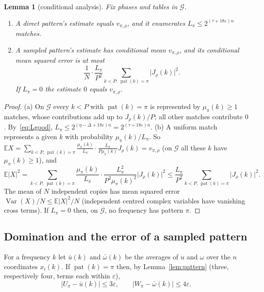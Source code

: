 \documentclass[11pt]{article}
\newtheorem{lemma}{Lemma}[section]
\theoremstyle{definition}
\newcommand{\E}{\mathbb E}
\newcommand{\eps}{\varepsilon}
\newcommand{\abs}[1]{\lvert #1\rvert}
\newcommand{\Var}{\operatorname{Var}}
\newcommand{\cG}{\mathcal G}
\newcommand{\pat}{\operatorname{pat}}
\begin{document}
\begin{lemma}[conditional analysis]\label{lem:cond}
Fix phases and tables in $\cG$.
\begin{enumerate}[label=\textup{(\alph*)}]
\item A direct pattern's estimate equals $v_{\pi,\rho}$, and it enumerates $L_\pi\le2^{(\tau+18\eps)n}$ matches.
\item A sampled pattern's estimate has conditional mean $v_{\pi,\rho}$, and its conditional mean squared error is at
most
\begin{equation}\label{eq:mse}
 \frac1N\cdot\frac{L_\pi}{P^2}\sum_{k<P:\ \pat(k)=\pi}\abs{J_\rho(k)}^2 .
\end{equation}
If $L_\pi=0$ the estimate $0$ equals $v_{\pi,\rho}$.
\end{enumerate}
\end{lemma}
\begin{proof}
(a) On $\cG$ every $k<P$ with $\pat(k)=\pi$ is represented by $\mu_\pi(k)\ge1$ matches, whose contributions add up to
$J_\rho(k)/P$; all other matches contribute $0$. By~\eqref{eq:Lgood},
$L_\pi\le2^{(\eta-\Delta+18\eps)n}=2^{(\tau+18\eps)n}$. (b) A uniform match represents a given $k$ with probability
$\mu_\pi(k)/L_\pi$. So $\E X=\sum_{k<P,\,\pat(k)=\pi}\frac{\mu_\pi(k)}{L_\pi}\cdot\frac{L_\pi}{P\mu_\pi(k)}J_\rho(k)=v_{\pi,\rho}$
(on $\cG$ all these $k$ have $\mu_\pi(k)\ge1$), and
\[
 \E\abs X^2=\sum_{k<P,\,\pat(k)=\pi}\frac{\mu_\pi(k)}{L_\pi}\cdot\frac{L_\pi^2}{P^2\mu_\pi(k)^2}\abs{J_\rho(k)}^2
 \le\frac{L_\pi}{P^2}\sum_{k<P,\,\pat(k)=\pi}\abs{J_\rho(k)}^2 .
\]
The mean of $N$ independent copies has mean squared error $\Var(X)/N\le\E\abs X^2/N$ (independent centred complex
variables have vanishing cross terms). If $L_\pi=0$ then, on $\cG$, no frequency has pattern $\pi$.
\end{proof}

\subsection{Domination and the error of a sampled pattern}
For a frequency $k$ let $\bar u(k)$ and $\bar\omega(k)$ be the averages of $u$ and $\omega$ over the $n$ coordinates
$x_i(k)$. If $\pat(k)=\pi$ then, by Lemma~\ref{lem:pattern} (three, respectively four, terms each within $\eps$),
\begin{equation}\label{eq:paterr}
 \abs{U_\pi-\bar u(k)}\le3\eps,\qquad\abs{W_\pi-\bar\omega(k)}\le4\eps .
\end{equation}
\end{document}
